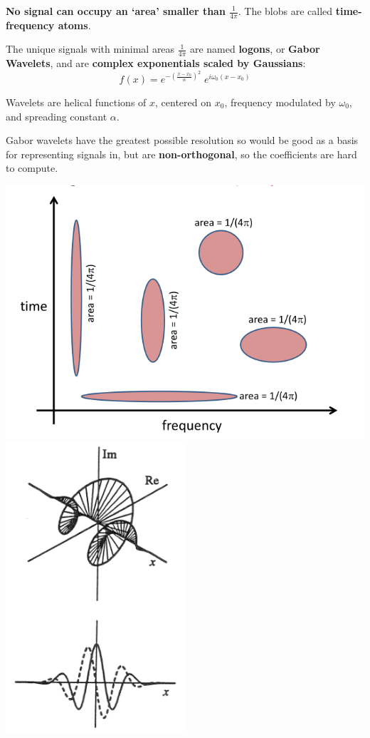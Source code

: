\documentclass[a4paper, 11pt]{article}
\begin{document}
{{\begin{minipage}[t]{0.6\textwidth}
        \textbf{No signal can occupy an `area' smaller than \(\displaystyle \frac{1}{4\pi}\)}. The blobs are called \textbf{time-frequency atoms}.

        The unique signals with minimal areas \(\frac{1}{4\pi}\) are named \textbf{logons}, or \textbf{Gabor Wavelets}, and are \textbf{complex exponentials scaled by Gaussians}:
        \[f(x) = e^{-(\frac{x-x_0}{\alpha})^2}\;e^{i\omega_0(x-x_0)}\]

        Wavelets are helical functions of \(x\), centered on \(x_0\), frequency modulated by \(\omega_0\), and spreading constant \(\alpha\).

        Gabor wavelets have the greatest possible resolution so would be good as a basis for representing signals in, but are \textbf{non-orthogonal}, so the coefficients are hard to compute.
        \end{minipage}
        \hspace{3mm}
        \begin{minipage}[t]{0.35\textwidth}
        \vspace{0pt}
        \centering
        \includegraphics[width=\textwidth]{gabor-quantal.png}\\
        \includegraphics[width=0.5\textwidth]{gabor-wavelets.png}
        \end{minipage}
    }
}
\end{document}
